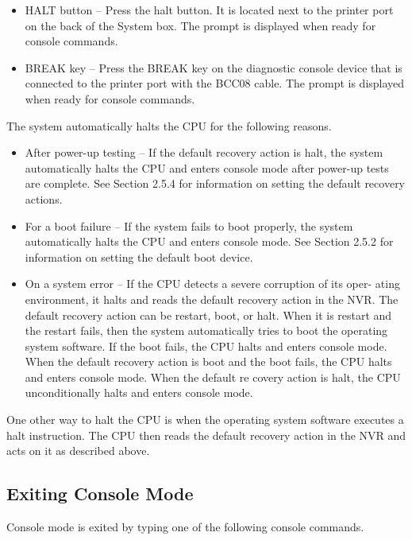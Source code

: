 \documentclass{decsectional}
\begin{document}
\begin{itemize}
\item HALT button -- Press the halt button. It is located next to the printer port
on the back of the System box. The \console prompt is displayed when
ready for console commands.
\item BREAK key -- Press the BREAK key on the diagnostic console device
that is connected to the printer port with the BCC08 cable. The \console
prompt is displayed when ready for console commands.
\end{itemize}
The system automatically halts the CPU for the following reasons.
\begin{itemize}
\item After power-up testing -- If the default recovery action is halt, the system
automatically halts the CPU and enters console mode after power-up
tests are complete. See Section 2.5.4 for information on setting the
default recovery actions.
\item For a boot failure -- If the system fails to boot properly, the system 
automatically halts the CPU and enters console mode. See Section 2.5.2
for information on setting the default boot device.
\item On a system error -- If the CPU detects a severe corruption of its oper-
ating environment, it halts and reads the default recovery action in the
NVR. The default recovery action can be restart, boot, or halt. When
it is restart and the restart fails, then the system automatically tries to
boot the operating system software. If the boot fails, the CPU halts and
enters console mode. When the default recovery action is boot and the
boot fails, the CPU halts and enters console mode. When the default re
covery action is halt, the CPU unconditionally halts and enters console
mode.
\end{itemize}

One other way to halt the CPU is when the operating system software 
executes a halt instruction. The CPU then reads the default recovery action in
the NVR and acts on it as described above.

\subsection{Exiting Console Mode}

Console mode is exited by typing one of the following console commands.
\end{document}
